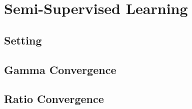 \chapter{Semi-Supervised Learning}\label{ch:SSL}
%
\section{Setting}
%
\section{Gamma Convergence}
%
\section{Ratio Convergence}
%

